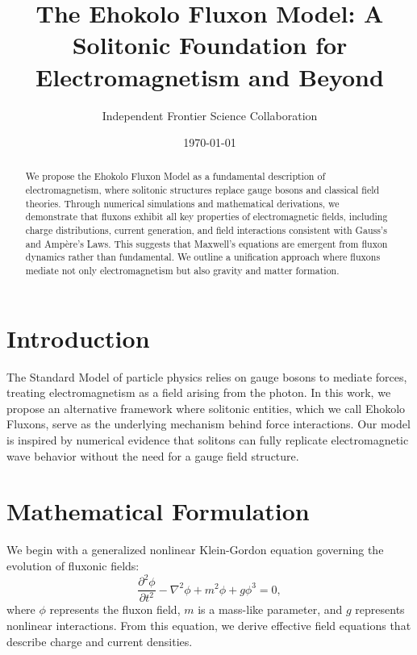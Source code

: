 \documentclass{article}
\title{The Ehokolo Fluxon Model: A Solitonic Foundation for Electromagnetism and Beyond}
\author{Independent Frontier Science Collaboration}
\date{\today}
\begin{document}
\maketitle

\begin{abstract}
We propose the Ehokolo Fluxon Model as a fundamental description of electromagnetism, where solitonic structures replace gauge bosons and classical field theories. Through numerical simulations and mathematical derivations, we demonstrate that fluxons exhibit all key properties of electromagnetic fields, including charge distributions, current generation, and field interactions consistent with Gauss’s and Ampère’s Laws. This suggests that Maxwell’s equations are emergent from fluxon dynamics rather than fundamental. We outline a unification approach where fluxons mediate not only electromagnetism but also gravity and matter formation.
\end{abstract}

\section{Introduction}
The Standard Model of particle physics relies on gauge bosons to mediate forces, treating electromagnetism as a field arising from the photon. In this work, we propose an alternative framework where solitonic entities, which we call Ehokolo Fluxons, serve as the underlying mechanism behind force interactions. Our model is inspired by numerical evidence that solitons can fully replicate electromagnetic wave behavior without the need for a gauge field structure.

\section{Mathematical Formulation}
We begin with a generalized nonlinear Klein-Gordon equation governing the evolution of fluxonic fields:
\begin{equation}
\frac{\partial^2 \phi}{\partial t^2} - \nabla^2 \phi + m^2 \phi + g \phi^3 = 0,
\end{equation}
where $\phi$ represents the fluxon field, $m$ is a mass-like parameter, and $g$ represents nonlinear interactions. From this equation, we derive effective field equations that describe charge and current densities.
\end{document}

